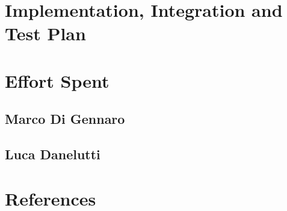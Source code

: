 \documentclass[10pt,openany]{book}
\begin{document}
	

	

\chapter{Implementation, Integration and Test Plan}\label{chapt:sum}

\chapter{Effort Spent}\label{chapt:sum}

	\section{Marco Di Gennaro}

		

	\section{Luca Danelutti}

		

\chapter{References}\label{chapt:sum}

	

\pagebreak




\end{document}
